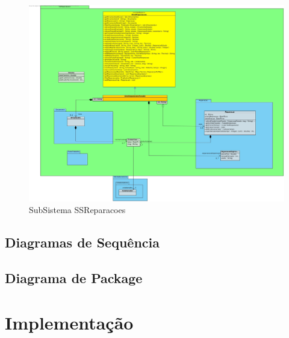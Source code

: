 \documentclass[a4paper,12pt]{scrreprt}
\begin{document}
\begin{figure}[!ht]
    \centering
    \includegraphics[scale=0.45]{SSReparacoesPackage.jpg}
    \caption{SubSistema SSReparacoes}
\end{figure}




\section{Diagramas de Sequência} \label{sec:diagrama_sequencia}


\section{Diagrama de Package} \label{sec:diagrama_package}


\chapter{Implementação} \label{chap:implementacao}

\end{document}
